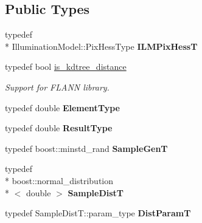 \subsection*{Public Types}
\begin{DoxyCompactItemize}
\item 
\hypertarget{classSSDBase_a9b40f04b4c91e32385a4acbe7f9d41e8}{typedef \\*
Illumination\-Model\-::\-Pix\-Hess\-Type {\bfseries I\-L\-M\-Pix\-Hess\-T}}\label{classSSDBase_a9b40f04b4c91e32385a4acbe7f9d41e8}

\item 
\hypertarget{classSSDBase_acccc8584f1ce25a8d3abb52a567db558}{typedef bool \hyperlink{classSSDBase_acccc8584f1ce25a8d3abb52a567db558}{is\-\_\-kdtree\-\_\-distance}}\label{classSSDBase_acccc8584f1ce25a8d3abb52a567db558}

\begin{DoxyCompactList}\small\item\em Support for F\-L\-A\-N\-N library. \end{DoxyCompactList}\item 
\hypertarget{classSSDBase_a0ff0f454c48a01788ec3f20a75313ca5}{typedef double {\bfseries Element\-Type}}\label{classSSDBase_a0ff0f454c48a01788ec3f20a75313ca5}

\item 
\hypertarget{classSSDBase_a40bb2a7b5e9ecdd3cf85495bdf72850c}{typedef double {\bfseries Result\-Type}}\label{classSSDBase_a40bb2a7b5e9ecdd3cf85495bdf72850c}

\item 
\hypertarget{classSSDBase_a7419085e42a9512e3f911607f91de58a}{typedef boost\-::minstd\-\_\-rand {\bfseries Sample\-Gen\-T}}\label{classSSDBase_a7419085e42a9512e3f911607f91de58a}

\item 
\hypertarget{classSSDBase_a2b3d661ca99caee6357eb0fac79ceb27}{typedef \\*
boost\-::normal\-\_\-distribution\\*
$<$ double $>$ {\bfseries Sample\-Dist\-T}}\label{classSSDBase_a2b3d661ca99caee6357eb0fac79ceb27}

\item 
\hypertarget{classSSDBase_a9b995e9aaf7fd90e87f793beecfdeb05}{typedef Sample\-Dist\-T\-::param\-\_\-type {\bfseries Dist\-Param\-T}}\label{classSSDBase_a9b995e9aaf7fd90e87f793beecfdeb05}

\end{DoxyCompactItemize}
